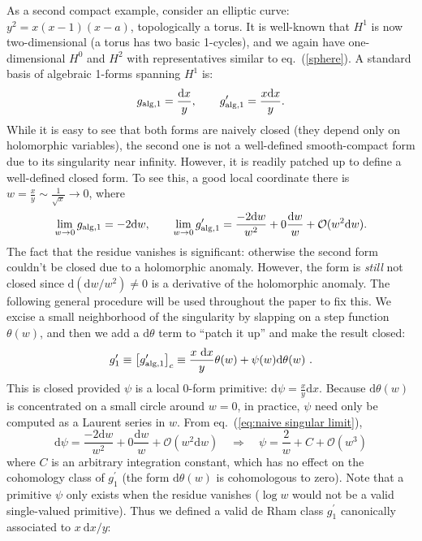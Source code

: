 \documentclass[11pt]{article}
\renewcommand{\d}{\text{d}}
\newcommand{\be}{\begin{equation}}
\newcommand{\ee}{\end{equation}}
\renewcommand{\O}{\mathcal{O}}
\newcommand{\alg}{{\rm alg}}
\begin{document}
As a second compact example, consider an elliptic curve: $y^2=x(x-1)(x-a)$, topologically a torus.
It is well-known that $H^1$ is now two-dimensional (a torus has two basic 1-cycles),
and we again have one-dimensional $H^0$ and $H^2$ with representatives similar to eq.~(\ref{sphere}).
A standard basis of algebraic 1-forms spanning $H^1$ is:
\be
 g_{\alg,1} = \frac{\d x}{y}, \qquad g_{\alg,1}^{\prime} = \frac{x \d x}{y}.
\ee
While it is easy to see that both forms are naively closed (they depend only on holomorphic variables),
the second one is not a well-defined smooth-compact form due to its singularity near infinity.
However, it is readily patched up to define a well-defined closed form.
To see this, a good local coordinate there is $w=\frac{x}{y} \sim \frac{1}{\sqrt{x}}\to 0$, where
\be
 \lim_{w\to 0} g_{\alg,1} = -2 \d w, \qquad \lim_{w\to 0} g_{\alg,1}^{\prime}  = \frac{-2 \d w}{w^2}  + 0 \frac{\d w}{w} + \O(w^2 \d w).
\label{eq:naive singular limit}
\ee
The fact that the residue vanishes is significant: otherwise the second form couldn't be closed due to a holomorphic anomaly.
However, the form is \emph{still} not closed since $\d(\d w/w^2)\neq 0$ is a derivative of the holomorphic anomaly.
The following general procedure will be used throughout the paper to fix this.
We excise a small neighborhood of the singularity by slapping on a step function $\theta(w)$,
and then we add a $\d\theta$ term to ``patch it up'' and make the result closed:
\be
g_1^\prime \equiv \left[ g_{\alg,1}^\prime \right]_c \equiv \frac{x\ \d x}{y}\theta(w) + \psi(w) \d\theta(w)\ .
\ee
This is closed provided $\psi$ is a local 0-form primitive: $\d\psi = \frac{x}{y} \d x$.
Because $\d\theta(w)$ is concentrated on a small circle around $w=0$, in practice, $\psi$ need only be computed as a Laurent series in $w$.
From eq.~(\ref{eq:naive singular limit}),
\be
\d\psi = \frac{-2 \d w}{w^2} + 0\frac{\d w}{w} + \O(w^2 \d w)\quad\Rightarrow\quad \psi = \frac{2}{w} + C + \O(w^3)
\label{eq:1st c-map example}
\ee
where $C$ is an arbitrary integration constant, which has no effect on the cohomology class of $g_1^\prime$
(the form $\d\theta(w)$ is cohomologous to zero).
Note that a primitive $\psi$ only exists when the residue vanishes ($\log w$ would not be a valid single-valued primitive).
Thus we defined a valid de Rham class $g_1^\prime$ canonically associated to $x\ \d x/y$:
\end{document}
